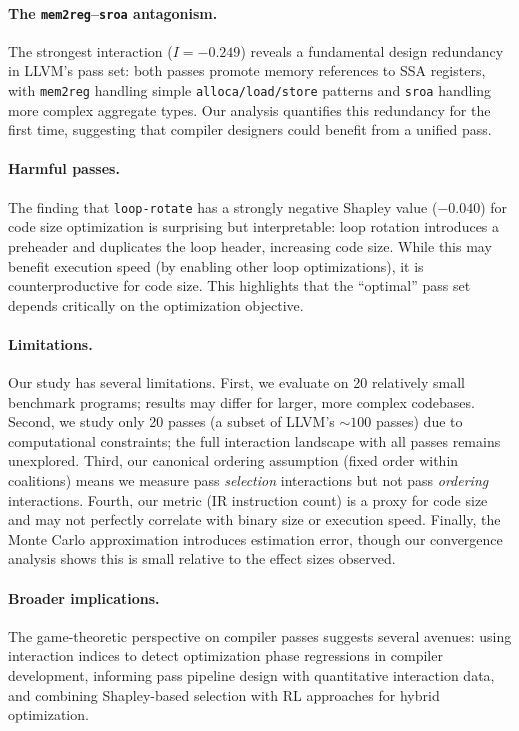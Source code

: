 \documentclass{article}
\newcommand{\sii}{I}
\begin{document}
\paragraph{The \texttt{mem2reg}--\texttt{sroa} antagonism.} The strongest interaction ($\sii = -0.249$) reveals a fundamental design redundancy in LLVM's pass set: both passes promote memory references to SSA registers, with \texttt{mem2reg} handling simple \texttt{alloca/load/store} patterns and \texttt{sroa} handling more complex aggregate types. Our analysis quantifies this redundancy for the first time, suggesting that compiler designers could benefit from a unified pass.

\paragraph{Harmful passes.} The finding that \texttt{loop-rotate} has a strongly negative Shapley value ($-0.040$) for code size optimization is surprising but interpretable: loop rotation introduces a preheader and duplicates the loop header, increasing code size. While this may benefit execution speed (by enabling other loop optimizations), it is counterproductive for code size. This highlights that the ``optimal'' pass set depends critically on the optimization objective.

\paragraph{Limitations.} Our study has several limitations. First, we evaluate on 20 relatively small benchmark programs; results may differ for larger, more complex codebases. Second, we study only 20 passes (a subset of LLVM's ${\sim}100$ passes) due to computational constraints; the full interaction landscape with all passes remains unexplored. Third, our canonical ordering assumption (fixed order within coalitions) means we measure pass \emph{selection} interactions but not pass \emph{ordering} interactions. Fourth, our metric (IR instruction count) is a proxy for code size and may not perfectly correlate with binary size or execution speed. Finally, the Monte Carlo approximation introduces estimation error, though our convergence analysis shows this is small relative to the effect sizes observed.

\paragraph{Broader implications.} The game-theoretic perspective on compiler passes suggests several avenues: using interaction indices to detect optimization phase regressions in compiler development, informing pass pipeline design with quantitative interaction data, and combining Shapley-based selection with RL approaches for hybrid optimization.
\end{document}
